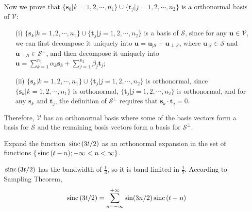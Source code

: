 \documentclass{assignment}
\begin{document}
\begin{sol}
\begin{itemize}
        Now we prove that $\{\bm{s}_k\vert k=1,2,\cdots,n_1\}\cup\{\bm{t}_j\vert j=1,2,\cdots,n_2\}$ is a orthonormal basis of $\mathcal{V}$:
        \begin{itemize}
            \item[(i)] $\{\bm{s}_k\vert k=1,2,\cdots,n_1\}\cup\{\bm{t}_j\vert j=1,2,\cdots,n_2\}$ is a basis of $\mathcal{S}$, since for any $\bm{u}\in\mathcal{V}$, we can first decompose it uniquely into $\bm{u}=\bm{u}_{\vert\mathcal{S}}+\bm{u}_{\perp\mathcal{S}}$, where $\bm{u}_{\vert\mathcal{S}}\in\mathcal{S}$ and $\bm{u}_{\perp\mathcal{S}}\in\mathcal{S}^{\perp}$, and then decompose it uniquely into $\bm{u}=\sum_{k=1}^{n_1}\alpha_k\bm{s}_k+\sum_{j=1}^{n_2}\beta_j\bm{t}_j$;
            \item[(ii)] $\{\bm{s}_k\vert k=1,2,\cdots,n_1\}\cup\{\bm{t}_j\vert j=1,2,\cdots,n_2\}$ is orthonormal, since $\{\bm{s}_k\vert k=1,2,\cdots,n_1\}$ is orthonormal, $\{\bm{t}_j\vert j=1,2,\cdots,n_2\}$ is orthonormal, and for any $\bm{s}_k$ and $\bm{t}_j$, the definition of $\mathcal{S}^{\perp}$ requires that $\bm{s}_k\cdot\bm{t}_j=0$.
        \end{itemize}
        Therefore, $\mathcal{V}$ has an orthonormal basis where some of the basis vectors form a basis for $\mathcal{S}$ and the remaining basis vectors form a basis for $\mathcal{S}^{\perp}$.
    \end{itemize}
\end{sol}

\begin{prob}
    Expand the function $\,\text{sinc}\,(3t/2)$ as an orthonormal expansion in the set of functions $\{\,\text{sinc}\,(t-n);-\infty<n<\infty\}$.
\end{prob}
\begin{sol}
    $\,\text{sinc}\,(3t/2)$ has the bandwidth of $\frac{1}{3}$, so it is band-limited in $\frac{1}{2}$. According to Sampling Theorem,
    \begin{align}
        \,\text{sinc}\,(3t/2)=\sum_{n=-\infty}^{+\infty}\sin(3n/2)\,\text{sinc}\,(t-n)
    \end{align}
\end{sol}
\end{document}
